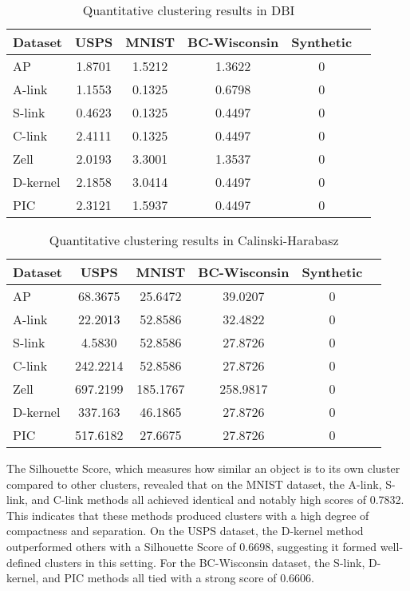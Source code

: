 \documentclass[
	10pt,
	parskip=half-,	
	paper=a4,
	english
	]{scrartcl}
\begin{document}
\begin{table}[h]
    \centering
    \caption{Quantitative clustering results in DBI}
    \begin{tabular}{lccccc}
    \toprule
    \textbf{Dataset} & \textbf{USPS} & \textbf{MNIST} & \textbf{BC-Wisconsin} & \textbf{Synthetic}\\
    \midrule
    AP       & 1.8701   & 1.5212 & 1.3622  & 0 \\
    A-link   & 1.1553  & 0.1325 & 0.6798  & 0   \\
    S-link   & 0.4623   & 0.1325 & 0.4497  & 0 \\
    C-link   & 2.4111   & 0.1325 & 0.4497  & 0 \\
    Zell     & 2.0193   & 3.3001 & 1.3537  & 0 \\
    D-kernel & 2.1858   & 3.0414 & 0.4497  & 0 \\
    PIC     & 2.3121    & 1.5937 & 0.4497 & 0 \\
    \bottomrule
    \end{tabular}
\end{table}

\begin{table}[h]
    \centering
    \caption{Quantitative clustering results in Calinski-Harabasz}
    \begin{tabular}{lccccc}
    \toprule
    \textbf{Dataset} & \textbf{USPS} & \textbf{MNIST} & \textbf{BC-Wisconsin} & \textbf{Synthetic}\\
    \midrule
    AP       & 68.3675   & 25.6472 & 39.0207  & 0 \\
    A-link   & 22.2013  & 52.8586 & 32.4822  & 0   \\
    S-link   & 4.5830   & 52.8586 & 27.8726  & 0 \\
    C-link   & 242.2214   & 52.8586 & 27.8726  & 0 \\
    Zell     & 697.2199   & 185.1767 & 258.9817  & 0 \\
    D-kernel & 337.163   & 46.1865 & 27.8726  & 0 \\
    PIC      & 517.6182 & 27.6675 & 27.8726 & 0 \\
    \bottomrule
    \end{tabular}
\end{table}

The Silhouette Score, which measures how similar an object is to its own cluster compared to other clusters, revealed that on the MNIST dataset, the A-link, S-link, and C-link methods all achieved identical and notably high scores of 0.7832. This indicates that these methods produced clusters with a high degree of compactness and separation. On the USPS dataset, the D-kernel method outperformed others with a Silhouette Score of 0.6698, suggesting it formed well-defined clusters in this setting. For the BC-Wisconsin dataset, the S-link, D-kernel, and PIC methods all tied with a strong score of 0.6606.
\end{document}
